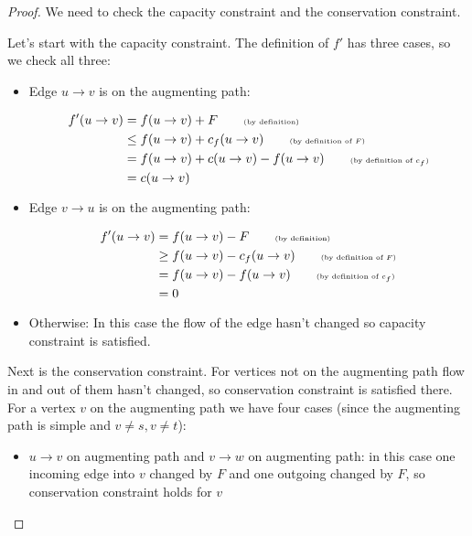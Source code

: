 \begin{proof}
We need to check the capacity constraint and the conservation constraint. 

Let's start with the capacity constraint. The definition of $f'$ has three cases, so we check all three:

\begin{itemize}

	\item Edge $u \rightarrow v$ is on the augmenting path:

\begin{align*}
f'(u \rightarrow v) &= f(u \rightarrow v) + F \tag*{\tiny{(by definition)}}\\
    &\leq f(u \rightarrow v) + c_f(u \rightarrow v) \tag*{\tiny{(by definition of $F$)}}\\
    &=  f(u \rightarrow v) + c(u \rightarrow v) - f(u \rightarrow v) \tag*{\tiny{(by definition of $c_f$)}}\\
    &=  c(u \rightarrow v)
\end{align*}

	\item Edge $v \rightarrow u$ is on the augmenting path:

\begin{align*}
f'(u \rightarrow v) &= f(u \rightarrow v) - F \tag*{\tiny{(by definition)}}\\
    &\geq f(u \rightarrow v) - c_f(u \rightarrow v) \tag*{\tiny{(by definition of $F$)}}\\
    &=  f(u \rightarrow v) - f(u \rightarrow v) \tag*{\tiny{(by definition of $c_f$)}}\\
    &=  0
\end{align*}

	\item Otherwise: In this case the flow of the edge hasn't changed so capacity constraint is satisfied.

\end{itemize}

Next is the conservation constraint. For vertices not on the augmenting path flow in and out of them hasn't changed, so conservation constraint is satisfied there. For a vertex $v$ on the augmenting path we have four cases (since the augmenting path is simple and $v \neq s, v \neq t$):

\begin{itemize} 

	\item $u \rightarrow v$ on augmenting path and $v \rightarrow w$ on augmenting path: in this case one incoming edge into $v$ changed by $F$ and one outgoing changed by $F$, so conservation constraint holds for $v$


\end{itemize}
\end{proof}
